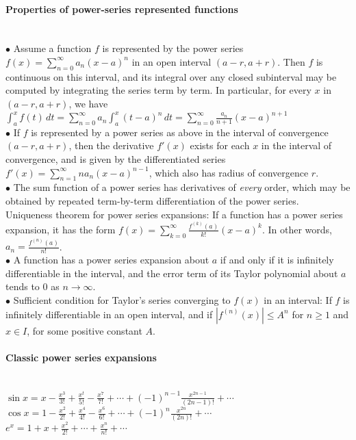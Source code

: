 \documentclass[10pt]{article}
\begin{document}
\paragraph{Properties of power-series represented functions}\ \\
$\bullet$ Assume a function $f$ is represented by the power series $f(x)=\sum_{n=0}^\infty a_n(x-a)^n$ in
an open interval $(a-r, a+r)$. Then $f$ is continuous on this interval, and its integral over any
closed subinterval may be computed by integrating the series term by term. In particular, for 
every $x$ in $(a - r, a + r)$, we have
$\int_a^xf(t)\,dt = \sum_{n=0}^\infty a_n\int_a^x (t-a)^n\,dt = \sum_{n=0}^\infty \frac{a_n}{n+1}(x-a)^{n+1}$\\
$\bullet$ If $f$ is represented by a power series as above in the interval of convergence $(a-r,a+r)$, then
the derivative $f'(x)$ exists for each $x$ in the interval of convergence, and is given by the
differentiated series $f'(x)=\sum_{n=1}^\infty na_n(x-a)^{n-1}$, which also has radius of convergence $r$.\\
$\bullet$ The sum function of a power series has derivatives of {\it every} order, which may be obtained by
repeated term-by-term differentiation of the power series.\\
Uniqueness theorem for power series expansions: If a function has a power series expansion, it has the form
$f(x)=\sum_{k=0}^\infty \frac{f^{(k)}(a)}{k!}(x-a)^k$.  In other words, $a_n = \frac{f^{(n)}(a)}{n!}$.\\
$\bullet$ A function has a power series expansion about $a$ if and only if it is infinitely differentiable in
the interval, and the error term of its Taylor polynomial about $a$ tends to $0$ as $n\to\infty$.\\
$\bullet$ Sufficient condition for Taylor's series converging to $f(x)$ in an interval:  If $f$ is infinitely
differentiable in an open interval, and if $|f^{(n)}(x)| \leq A^n$ for $n\geq 1$ and $x\in I$, for
some positive constant $A$.

\paragraph{Classic power series expansions}\ \\
$\sin x = x - \frac{x^3}{3!}+\frac{x^t}{5!}-\frac{x^7}{7!}+\cdots+(-1)^{n-1}\frac{x^{2n-1}}{(2n-1)!}+\cdots$\\
$\cos x = 1-\frac{x^2}{2!}+\frac{x^4}{4!}-\frac{x^6}{6!}+\cdots+(-1)^n\frac{x^{2n}}{(2n)!}+\cdots$\\
$e^x=1+x+\frac{x^2}{2!}+\cdots+\frac{x^n}{n!}+\cdots$
\end{document}
